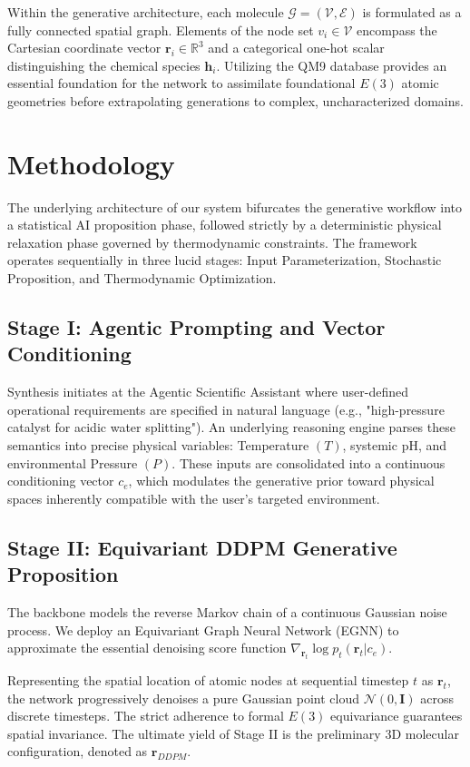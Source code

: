 \documentclass[conference]{IEEEtran}
\begin{document}
Within the generative architecture, each molecule $\mathcal{G} = (\mathcal{V}, \mathcal{E})$ is formulated as a fully connected spatial graph. Elements of the node set $v_i \in \mathcal{V}$ encompass the Cartesian coordinate vector $\mathbf{r}_i \in \mathbb{R}^3$ and a categorical one-hot scalar distinguishing the chemical species $\mathbf{h}_i$. Utilizing the QM9 database provides an essential foundation for the network to assimilate foundational $E(3)$ atomic geometries before extrapolating generations to complex, uncharacterized domains.

\section{Methodology}

The underlying architecture of our system bifurcates the generative workflow into a statistical AI proposition phase, followed strictly by a deterministic physical relaxation phase governed by thermodynamic constraints. The framework operates sequentially in three lucid stages: Input Parameterization, Stochastic Proposition, and Thermodynamic Optimization.

\subsection{Stage I: Agentic Prompting and Vector Conditioning}
Synthesis initiates at the Agentic Scientific Assistant where user-defined operational requirements are specified in natural language (e.g., "high-pressure catalyst for acidic water splitting"). An underlying reasoning engine parses these semantics into precise physical variables: Temperature $(T)$, systemic pH, and environmental Pressure $(P)$. These inputs are consolidated into a continuous conditioning vector $c_e$, which modulates the generative prior toward physical spaces inherently compatible with the user's targeted environment.

\subsection{Stage II: Equivariant DDPM Generative Proposition}
The backbone models the reverse Markov chain of a continuous Gaussian noise process. We deploy an Equivariant Graph Neural Network (EGNN) to approximate the essential denoising score function $\nabla_{\mathbf{r}_t} \log p_t(\mathbf{r}_t | c_e)$. 

Representing the spatial location of atomic nodes at sequential timestep $t$ as $\mathbf{r}_t$, the network progressively denoises a pure Gaussian point cloud $\mathcal{N}(0, \mathbf{I})$ across discrete timesteps. The strict adherence to formal $E(3)$ equivariance guarantees spatial invariance. The ultimate yield of Stage II is the preliminary 3D molecular configuration, denoted as $\mathbf{r}_{DDPM}$.
\end{document}
